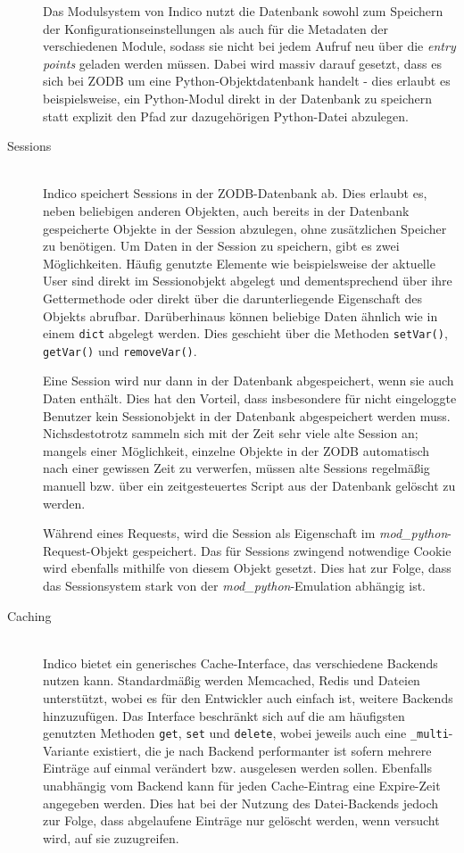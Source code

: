 \begin{description}
Das Modulsystem von Indico nutzt die Datenbank sowohl zum Speichern der Konfigurationseinstellungen
als auch für die Metadaten der verschiedenen Module, sodass sie nicht bei jedem Aufruf neu über die
\emph{entry points} geladen werden müssen. Dabei wird massiv darauf gesetzt, dass es sich bei ZODB
um eine Python-Objektdatenbank handelt - dies erlaubt es beispielsweise, ein Python-Modul direkt in
der Datenbank zu speichern statt explizit den Pfad zur dazugehörigen Python-Datei abzulegen.


\item[Sessions] \hfill \\
Indico speichert Sessions in der ZODB-Datenbank ab. Dies erlaubt es, neben beliebigen anderen
Objekten, auch bereits in der Datenbank gespeicherte Objekte in der Session abzulegen, ohne
zusätzlichen Speicher zu benötigen. Um Daten in der Session zu speichern, gibt es zwei
Möglichkeiten. Häufig genutzte Elemente wie beispielsweise der aktuelle User sind direkt im
Sessionobjekt abgelegt und dementsprechend über ihre Gettermethode oder direkt über die
darunterliegende Eigenschaft des Objekts abrufbar. Darüberhinaus können beliebige Daten ähnlich wie
in einem \lstinline{dict} abgelegt werden. Dies geschieht über die Methoden \lstinline{setVar()},
\lstinline{getVar()} und \lstinline{removeVar()}.

Eine Session wird nur dann in der Datenbank abgespeichert, wenn sie auch Daten enthält. Dies hat den
Vorteil, dass insbesondere für nicht eingeloggte Benutzer kein Sessionobjekt in der Datenbank
abgespeichert werden muss. Nichsdestotrotz sammeln sich mit der Zeit sehr viele alte Session an;
mangels einer Möglichkeit, einzelne Objekte in der ZODB automatisch nach einer gewissen Zeit zu
verwerfen, müssen alte Sessions regelmäßig manuell bzw. über ein zeitgesteuertes Script aus der
Datenbank gelöscht zu werden.

Während eines Requests, wird die Session als Eigenschaft im \emph{mod\_python}-Request-Objekt
gespeichert. Das für Sessions zwingend notwendige Cookie wird ebenfalls mithilfe von diesem Objekt
gesetzt. Dies hat zur Folge, dass das Sessionsystem stark von der \emph{mod\_python}-Emulation
abhängig ist.


\item[Caching] \hfill \\
Indico bietet ein generisches Cache-Interface, das verschiedene Backends nutzen kann.
Standardmäßig werden Memcached, Redis und Dateien unterstützt, wobei es für den Entwickler auch
einfach ist, weitere Backends hinzuzufügen. Das Interface beschränkt sich auf die am häufigsten
genutzten Methoden \lstinline{get}, \lstinline{set} und \lstinline{delete}, wobei jeweils auch
eine \lstinline{_multi}-Variante existiert, die je nach Backend performanter ist sofern mehrere
Einträge auf einmal verändert bzw. ausgelesen werden sollen. Ebenfalls unabhängig vom Backend kann
für jeden Cache-Eintrag eine Expire-Zeit angegeben werden. Dies hat bei der Nutzung des
Datei-Backends jedoch zur Folge, dass abgelaufene Einträge nur gelöscht werden, wenn versucht wird,
auf sie zuzugreifen.


\end{description}
